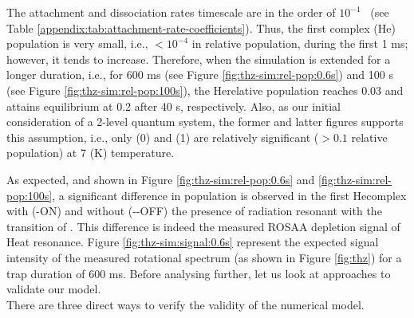 % 


The attachment and dissociation rates timescale are in the order of $10^{-1}$
\pers\ (see Table \ref{appendix:tab:attachment-rate-coefficients}). Thus, the
first complex (He\CD) population is very small, i.e., $<10^{-4}$ in relative
population, during the first 1 ms; however, it tends to increase. Therefore,
when the simulation is extended for a longer duration, i.e., for 600 ms (see
Figure \ref{fig:thz-sim:rel-pop:0.6s}) and 100 s (see Figure
\ref{fig:thz-sim:rel-pop:100s}), the He\CD relative population reaches 0.03 and
attains equilibrium at 0.2 after 40 s, respectively. Also, as our initial
consideration of a 2-level quantum system, the former and latter figures
supports this assumption, i.e., only \CD(0) and \CD(1) are relatively
significant ($>0.1$ relative population) at 7 (K) temperature.

As expected, and shown in Figure \ref{fig:thz-sim:rel-pop:0.6s} and
\ref{fig:thz-sim:rel-pop:100s}, a significant difference in population is
observed in the first He\CD complex with (-ON) and without (-\--OFF) the
presence of radiation resonant with the \CDline transition of \CD. This
difference is indeed the measured ROSAA depletion signal of He\CD at resonance.
Figure \ref{fig:thz-sim:signal:0.6s} represent the expected signal intensity of
the measured rotational spectrum (as shown in Figure \ref{fig:thz}) for a trap
duration of 600 ms. Before analysing further, let us look at approaches to
validate our model.\\

% 


There are three direct ways to verify the validity of the numerical model.

